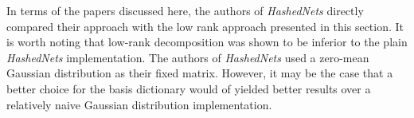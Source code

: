 \documentclass[journal]{IEEEtran}
\begin{document}
In terms of the papers discussed here, the authors of \textit{HashedNets} directly compared their approach with the low rank approach presented in this section. It is worth noting that low-rank decomposition was shown to be inferior to the plain \textit{HashedNets} implementation. The authors of \textit{HashedNets} used a zero-mean Gaussian distribution as their fixed matrix. However, it may be the case that a better choice for the basis dictionary would of yielded better results over a relatively naive Gaussian distribution implementation. 





%
%



%
%
\end{document}
